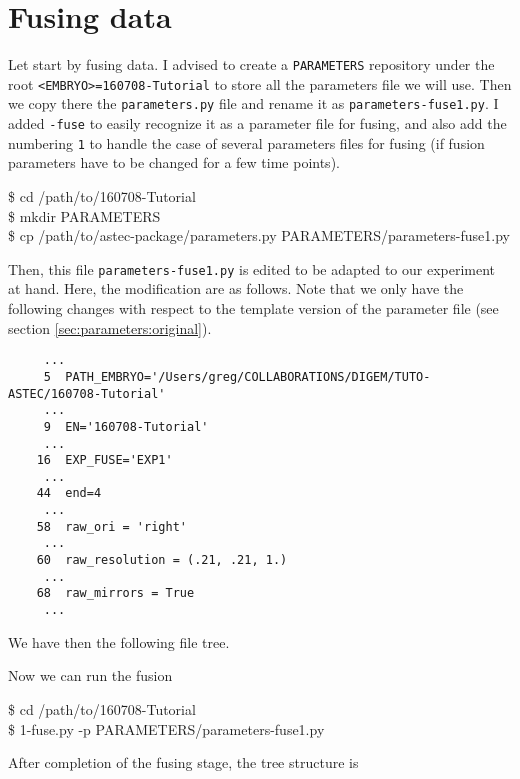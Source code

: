 \section{Fusing data}

Let start by fusing data. I advised to create a \texttt{PARAMETERS} repository under the root \texttt{<EMBRYO>=160708-Tutorial} to store all the parameters file we will use. Then we copy there the \texttt{parameters.py} file and rename it as \texttt{parameters-fuse1.py}. I added \texttt{-fuse} to easily recognize it as a parameter file for fusing, and also add the numbering \texttt{1} to handle the case of several parameters files for fusing (if fusion parameters have to be changed for a few time points).

\begin{code}{0.8}
\$ cd /path/to/160708-Tutorial\\
\$ mkdir PARAMETERS\\
\$ cp /path/to/astec-package/parameters.py  PARAMETERS/parameters-fuse1.py
\end{code}


Then, this file \texttt{parameters-fuse1.py} is edited to be adapted to our experiment at hand. Here, the modification are as follows. Note that we only have the following changes with respect to the template version of the parameter file (see section \ref{sec:parameters:original}).

\begin{verbatim}
     ...
     5	PATH_EMBRYO='/Users/greg/COLLABORATIONS/DIGEM/TUTO-ASTEC/160708-Tutorial'	
     ...
     9	EN='160708-Tutorial'			
     ... 
    16	EXP_FUSE='EXP1'	
     ...
    44	end=4   				 
     ...
    58	raw_ori = 'right' 				
     ...
    60	raw_resolution = (.21, .21, 1.) 
     ...
    68	raw_mirrors = True  			
     ...
\end{verbatim}

We have then the following file tree.


Now we can run the fusion

\begin{code}{0.8}
\$ cd /path/to/160708-Tutorial\\
\$ 1-fuse.py -p PARAMETERS/parameters-fuse1.py 
\end{code}

After completion of the fusing stage, the tree structure is 

